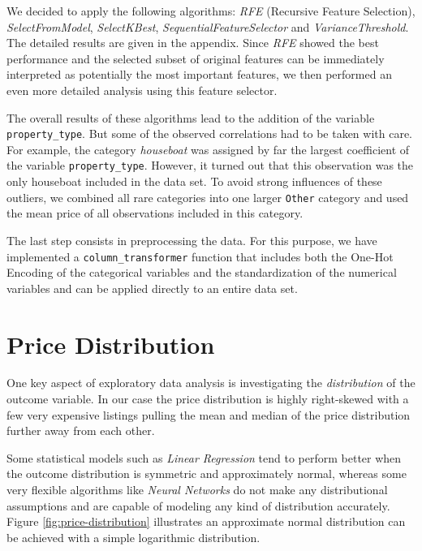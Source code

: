 \documentclass[12pt, letterpaper]{article}
\begin{document}
We decided to apply the following algorithms: \textit{RFE} (Recursive Feature Selection), \textit{SelectFromModel}, \textit{SelectKBest}, \textit{SequentialFeatureSelector} and \textit{VarianceThreshold}. The detailed results are given in the appendix.
Since \textit{RFE} showed the best performance and the selected subset of original features can be immediately interpreted as potentially the most important features, we then performed an even more detailed analysis using this feature selector.

The overall results of these algorithms lead to the addition of the variable \texttt{property\_type}. But some of the observed correlations had to be taken with care. For example, the category \emph{houseboat} was assigned by far the largest coefficient of the variable \verb|property_type|.
However,  it turned out that this observation was the only houseboat included in the data set.
To avoid strong influences of these outliers, we combined all rare categories into one larger \texttt{Other} category and used the mean price of all observations included in this category.

The last step consists in preprocessing the data. For this purpose, we have implemented a \texttt{column\_transformer} function that includes both the One-Hot Encoding of the categorical variables and the standardization of the numerical variables and can be applied directly to an entire data set.


\section{Price Distribution}

One key aspect of exploratory data analysis is investigating the \emph{distribution} of the outcome variable.
In our case the price distribution is highly right-skewed with a few very expensive listings pulling the mean and median of the price distribution further away from each other.

Some statistical models such as \emph{Linear Regression} tend to perform better when the outcome distribution is symmetric and approximately normal, whereas some very flexible algorithms like \emph{Neural Networks} do not make any distributional assumptions and are capable of modeling any kind of distribution accurately.
Figure \ref{fig:price-distribution} illustrates an approximate normal distribution can be achieved with a simple logarithmic distribution.
\end{document}
